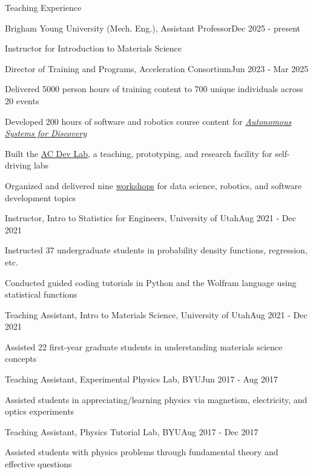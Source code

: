 \documentclass{resume} %
\begin{document}
\begin{rSection}{Teaching Experience}

\begin{rSubsection}{Brigham Young University (Mech. Eng.), Assistant Professor}{Dec 2025 - present}{} \\
\item Instructor for Introduction to Materials Science
\end{rSubsection}

\begin{rSubsection}{Director of Training and Programs, Acceleration Consortium}{Jun 2023 - Mar 2025}{} \\
\item Delivered 5000 person hours of training content to 700 unique individuals across 20 events
\item Developed 200 hours of software and robotics course content for \href{https://ac-microcourses.readthedocs.io/}{\textit{Autonomous Systems for Discovery}}
\item Built the \href{https://ac-training-lab.readthedocs.io/}{AC Dev Lab}, a teaching, prototyping, and research facility for self-driving labs
\item Organized and delivered nine \href{https://youtu.be/IVaWl2tL06c?si=DYrhZP6uvK5srQ58}{workshops} for data science, robotics, and software development topics
\end{rSubsection}
\begin{rSubsection}{Instructor, Intro to Statistics for Engineers, University of Utah}{Aug 2021 - Dec 2021}{} \\
\item  Instructed 37 undergraduate students in probability density functions, regression, etc.
\item Conducted guided coding tutorials in Python and the Wolfram language using statistical functions
\end{rSubsection}
\begin{rSubsection}{Teaching Assistant, Intro to Materials Science, University of Utah}{Aug 2021 - Dec 2021}{} \\
\item Assisted 22 first-year graduate students in understanding materials science concepts
\end{rSubsection}
\begin{rSubsection}{Teaching Assistant, Experimental Physics Lab, BYU}{Jun 2017 - Aug 2017}{} \\
\item Assisted students in appreciating/learning physics via magnetism, electricity, and optics experiments
\end{rSubsection}
\begin{rSubsection}{Teaching Assistant, Physics Tutorial Lab, BYU}{Aug 2017 - Dec 2017}{} \\
\item Assisted students with physics problems through fundamental theory and effective questions
\end{rSubsection}
\end{rSection}
\end{document}
